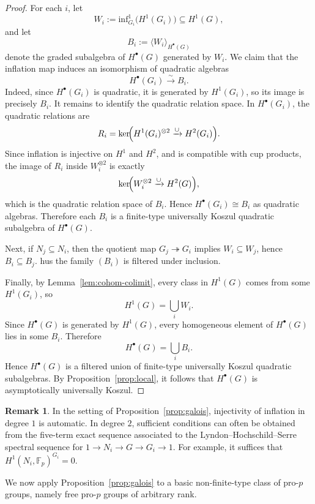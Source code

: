 \documentclass[11pt]{amsart}
\numberwithin{equation}{section}
\theoremstyle{definition}
\newtheorem{remark}[theorem]{Remark}
\begin{document}
	\begin{proof}
		For each \(i\), let
		\[W_i:=\mathrm{inf}^1_{G_i}\bigl(H^1(G_i)\bigr)\subseteq H^1(G),\] and let
		\[B_i:=\langle W_i\rangle_{H^\bullet(G)}\]
		denote the graded subalgebra of \(H^\bullet(G)\) generated by \(W_i\). We claim that the inflation map induces an isomorphism of quadratic algebras
		\[H^\bullet(G_i)\xrightarrow{\sim} B_i.\]
		Indeed, since \(H^\bullet(G_i)\) is quadratic, it is generated by \(H^1(G_i)\), so its image is precisely \(B_i\). It remains to identify the quadratic relation space. In \(H^\bullet(G_i)\), the quadratic relations are
		\[R_i=\ker\!\Bigl(H^1(G_i)^{\otimes 2}\xrightarrow{\cup} H^2(G_i)\Bigr).\]
		Since inflation is injective on \(H^1\) and \(H^2\), and is compatible with cup products, the image of \(R_i\) inside \(W_i^{\otimes 2}\) is exactly
		\[\ker\!\Bigl(W_i^{\otimes 2}\xrightarrow{\cup} H^2(G)\Bigr),\]
		which is the quadratic relation space of \(B_i\). Hence $H^\bullet(G_i)\cong B_i$ as quadratic algebras. Therefore each \(B_i\) is a finite-type universally Koszul quadratic subalgebra of \(H^\bullet(G)\).
		
		Next, if \(N_j\subseteq N_i\), then the quotient map \(G_j\twoheadrightarrow G_i\) implies $W_i\subseteq W_j$, hence $B_i\subseteq B_j$. hus the family \((B_i)\) is filtered under inclusion.
		
		Finally, by Lemma~\ref{lem:cohom-colimit}, every class in \(H^1(G)\) comes from some \(H^1(G_i)\), so \[H^1(G)=\bigcup_i W_i.\]
		Since \(H^\bullet(G)\) is generated by \(H^1(G)\), every homogeneous element of \(H^\bullet(G)\) lies in some \(B_i\). Therefore \[H^\bullet(G)=\bigcup_i B_i.\] Hence \(H^\bullet(G)\) is a filtered union of finite-type universally Koszul quadratic subalgebras. By Proposition~\ref{prop:local}, it follows that \(H^\bullet(G)\) is asymptotically universally Koszul.
	\end{proof}
	
	
	\begin{remark}
		In the setting of Proposition~\ref{prop:galois}, injectivity of inflation in degree \(1\) is automatic. In degree \(2\), sufficient conditions can often be obtained from the five-term exact sequence associated to the Lyndon--Hochschild--Serre spectral sequence for $1\to N_i\to G\to G_i\to 1$. For example, it suffices that $H^1(N_i,\mathbb F_p)^{G_i}=0$. 
	\end{remark}
	
	
	
	
	We now apply Proposition~\ref{prop:galois} to a basic non-finite-type class of pro-$p$ groups, namely free pro-$p$ groups of arbitrary rank.
	
\end{document}
